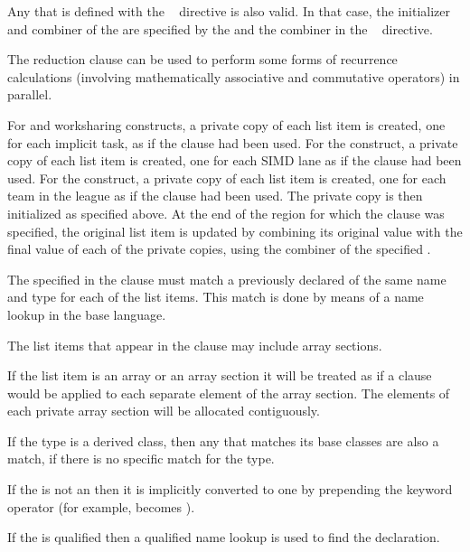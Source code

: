 Any  that is defined with the ~ directive is 
also valid. In that case, the initializer and combiner of the  are 
specified by the  and the combiner in the ~ 
directive.

\descr
The reduction clause can be used to perform some forms of recurrence calculations 
(involving mathematically associative and commutative operators) in parallel.

For  and worksharing constructs, a private copy of each list item is created, 
one for each implicit task, as if the  clause had been used. For the  
construct, a private copy of each list item is created, one for each SIMD lane as if the 
 clause had been used. For the  construct, a private copy of each list 
item is created, one for each team in the league as if the  clause had been 
used. The private copy is then initialized as specified above. At the end of the region for 
which the  clause was specified, the original list item is updated by 
combining its original value with the final value of each of the private copies, using the 
combiner of the specified .

The  specified in the  clause must match a previously 
declared  of the same name and type for each of the list items. This 
match is done by means of a name lookup in the base language. 

\ccppspecificstart
The list items that appear in the  clause may include array sections.

If the list item is an array or an array section it will be treated as if a  clause would be applied to each separate element of the array section. The elements of each private array section will be allocated contiguously.
\ccppspecificend

\cppspecificstart
If the type is a derived class, then any  that matches its base classes 
are also a match, if there is no specific match for the type.

If the  is not an  then it is implicitly converted to one by 
prepending the keyword operator (for example, \code{+} becomes ).

If the  is qualified then a qualified name lookup is used to find the 
declaration.

